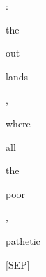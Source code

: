 \documentclass[varwidth=150mm]{standalone}
\begin{document}
\begin{CJK*}{UTF8}{gbsn}
{{{\colorbox{red!2.2949562072753906}{\strut :} \colorbox{red!4.602830410003662}{\strut the} \colorbox{red!2.8430135250091553}{\strut out}\colorbox{red!1.0320123434066772}{\strut lands} \colorbox{red!0.0}{\strut ,} \colorbox{red!2.490433692932129}{\strut where} \colorbox{red!1.6248990297317505}{\strut all} \colorbox{red!4.911679744720459}{\strut the} \colorbox{red!3.391573429107666}{\strut poor} \colorbox{red!3.3687498569488525}{\strut ,} \colorbox{red!8.907312393188477}{\strut pathetic} \colorbox{red!3.8672361373901367}{\strut [SEP]}
}}}
\end{CJK*}
\end{document}
